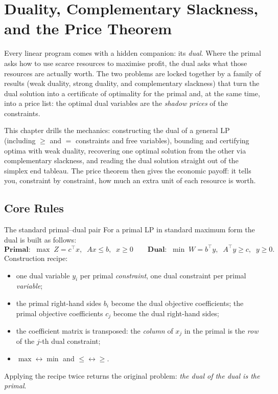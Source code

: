 \chapter{Duality, Complementary Slackness, and the Price Theorem}

Every linear program comes with a hidden companion: its \emph{dual}. Where the primal asks how to use scarce resources to
maximise profit, the dual asks what those resources are actually worth. The
two problems are locked together by a family of results (weak duality,
strong duality, and complementary slackness) that turn the dual solution
into a certificate of optimality for the primal and, at the same time, into
a price list: the optimal dual variables are the \emph{shadow prices} of the constraints.

This chapter drills the mechanics: constructing the dual of a general LP
(including $\ge$ and $=$ constraints and free variables), bounding and
certifying optima with weak duality, recovering one optimal solution from
the other via complementary slackness, and reading the dual solution
straight out of the simplex end tableau. The price
theorem then gives the economic payoff: it tells you,
constraint by constraint, how much an extra unit of each resource is worth.

\section{Core Rules}

\begin{rulebox}{The standard primal--dual pair}
For a primal LP in standard maximum form the dual is built as follows:
\[
  \textbf{Primal:}\;\;
  \max\; Z=c^{\top}x,\;\; Ax\le b,\;\; x\ge 0
  \qquad
  \textbf{Dual:}\;\;
  \min\; W=b^{\top}y,\;\; A^{\top}y\ge c,\;\; y\ge 0 .
\]
Construction recipe:
\begin{itemize}[leftmargin=1.6em,itemsep=0.3ex]
  \item one dual variable $y_{i}$ per primal \emph{constraint}, one dual
        constraint per primal \emph{variable};
  \item the primal right-hand sides $b_{i}$ become the dual objective
        coefficients; the primal objective coefficients $c_{j}$ become the
        dual right-hand sides;
  \item the coefficient matrix is transposed: the \emph{column} of $x_{j}$
        in the primal is the \emph{row} of the $j$-th dual constraint;
  \item $\max\leftrightarrow\min$ and $\le\leftrightarrow\ge$.
\end{itemize}
Applying the recipe twice returns the original problem: \emph{the dual of
the dual is the primal}.
\end{rulebox}

